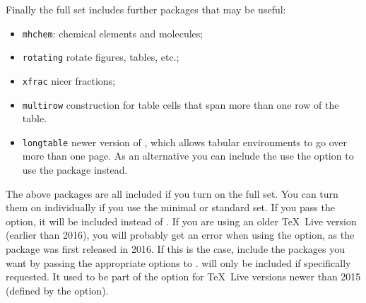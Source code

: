 Finally the full set includes further packages that may be useful:
\begin{itemize}\setlength{\parskip}{0pt}\setlength{\itemsep}{0pt}
\item \texttt{mhchem}: chemical elements and molecules;
\item \texttt{rotating} rotate figures, tables, etc.;
\item \texttt{xfrac} nicer fractions;
\item \texttt{multirow} construction for table cells that span more than one row of the table.
\item \texttt{longtable} newer version of , which allows tabular environments to go over more than one page.
  As an alternative you can include the use the option  to use the  package instead.
\end{itemize}
The above packages are all included if you turn on the full set.
You can turn them on individually if you use the minimal or standard set.
If you pass the  option, it will be included instead of .
 If you are using an older \TeX\ Live version (earlier than 2016),
you will probably get an error when using the  option,
as the  package was first released in 2016.
If this is the case, include the packages you want by passing the appropriate options to .
  will only be included if specifically requested.
  It used to be part of the  option
  for \TeX\ Live versions newer than 2015 (defined by the  option).

